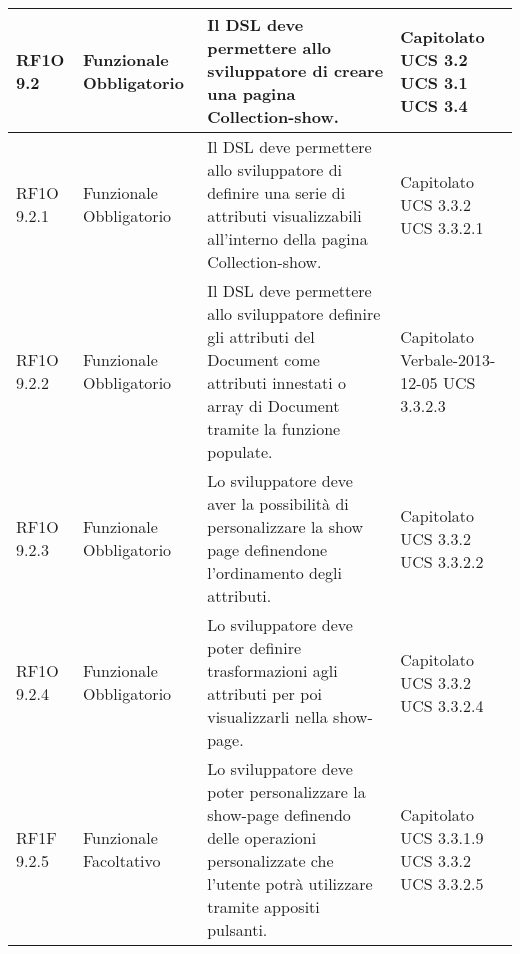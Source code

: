\begin{center}
\begin{longtable}{ | l | p{2cm} | p{5cm} | p{1.7cm} |}
				RF1O 9.2 & Funzionale \newline  Obbligatorio  & Il DSL deve permettere allo sviluppatore di creare una pagina Collection-show. &  Capitolato \newline  UCS 3.2 \newline  UCS 3.1 \newline  UCS 3.4 \newline  \\ \hline      
				RF1O 9.2.1 & Funzionale \newline  Obbligatorio  & Il DSL deve permettere allo sviluppatore di definire una serie di attributi visualizzabili all’interno della pagina Collection-show. &  Capitolato \newline  UCS 3.3.2 \newline  UCS 3.3.2.1 \newline  \\ \hline      
				RF1O 9.2.2 & Funzionale \newline  Obbligatorio  & Il DSL deve permettere allo sviluppatore definire gli attributi del Document come attributi innestati o array di Document tramite la funzione populate. &  Capitolato \newline  Verbale-2013-12-05 \newline  UCS 3.3.2.3 \newline  \\ \hline      
				RF1O 9.2.3 & Funzionale \newline  Obbligatorio  & Lo sviluppatore deve aver la possibilità di personalizzare la show page definendone l’ordinamento degli attributi. &  Capitolato \newline  UCS 3.3.2 \newline  UCS 3.3.2.2 \newline  \\ \hline      
				RF1O 9.2.4 & Funzionale \newline  Obbligatorio  & Lo sviluppatore deve poter definire trasformazioni agli attributi per poi visualizzarli nella show-page. &  Capitolato \newline  UCS 3.3.2 \newline  UCS 3.3.2.4 \newline  \\ \hline      
				RF1F 9.2.5 & Funzionale \newline  Facoltativo  & Lo sviluppatore deve poter personalizzare la show-page definendo delle operazioni personalizzate che l’utente potrà utilizzare tramite appositi pulsanti. &  Capitolato \newline  UCS 3.3.1.9 \newline  UCS 3.3.2 \newline  UCS 3.3.2.5 \newline  \\ \hline      

\end{longtable}
\end{center}
